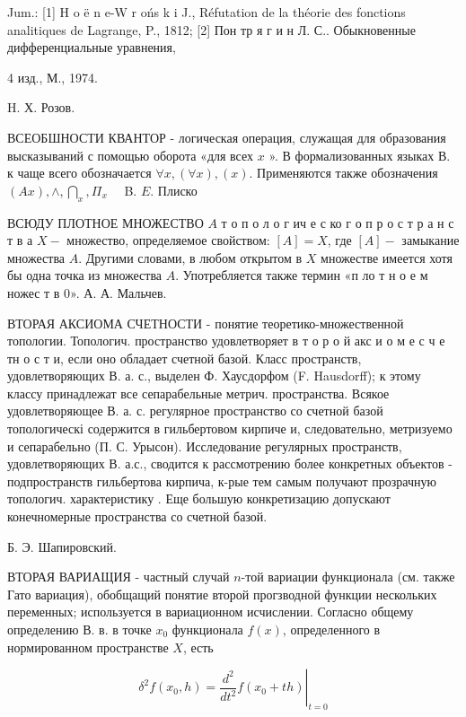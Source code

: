 \documentclass[10pt]{article}
\begin{document}
Jum.: [1] H o ë n e-W r ońs k i J., Réfutation de la théorie des fonctions analitiques de Lagrange, P., 1812; [2] Пон тр я г и н Л. С.. Обыкновенные дифференциальные уравнения,

4 изд., М., 1974.

H. Х. Розов.



ВСЕОБШНОСТИ КВАНТОР - логическая операция, служащая для образования высказываний с помощью оборота «для всех $x$ ». В формализованных языках В. к чаще всего обозначается $\forall x,(\forall x),(x)$. Применяются также обозначения $(A x), \wedge, \bigcap_{x}, \Pi_{x} \quad$ B. $E$. Плиско



ВСЮДУ ПЛОТНОЕ МНОЖЕСТВО $A$ т о п о л о г ич е с ко г о п р о с т р а н с т в а $X-$ множество, определяемое свойством: $[A]=X$, где $[A]-$ замыкание множества $A$. Другими словами, в любом открытом в $X$ множестве имеется хотя бы одна точка из множества $A$. Употребляется также термин «п ло т н о е м ножес т в 0». А. А. Мальчев.



ВТОРАЯ АКСИОМА СЧЕТНОСТИ - понятие теоретико-множественной топологии. Топологич. пространство удовлетворяет в т о р о й акс и о м е с ч е тн о с т и, если оно обладает счетной базой. Класс пространств, удовлетворяющих В. а. с., выделен Ф. Хаусдорфом (F. Hausdorff); к этому классу принадлежат все сепарабельные метрич. пространства. Всякое удовлетворяющее В. а. с. регулярное пространство со счетной базой топологическі содержится в гильбертовом кирпиче и, следовательно, метризуемо и сепарабельно (П. С. Урысон). Исследование регулярных пространств, удовлетворяющих В. а.с., сводится к рассмотрению более конкретных объектов - подпространств гильбертова кирпича, к-рые тем самым получают прозрачную топологич. характеристику . Еще большую конкретизацию допускают конечномерные пространства со счетной базой.



Б. Э. Шапировский.



ВТОРАЯ ВАРИАЩИЯ - частный случай $n$-той вариации функционала (см. также Гато вариация), обобщащий понятие второй прогзводной функции нескольких переменных; используется в вариационном исчислении. Согласно общему определению В. в. в точке $x_{0}$ функционала $f(x)$, определенного в нормированном пространстве $X$, есть



\[

\delta^{2} f\left(x_{0}, h\right)=\left.\frac{d^{2}}{d t^{2}} f\left(x_{0}+t h\right)\right|_{t=0}

\]
\end{document}
